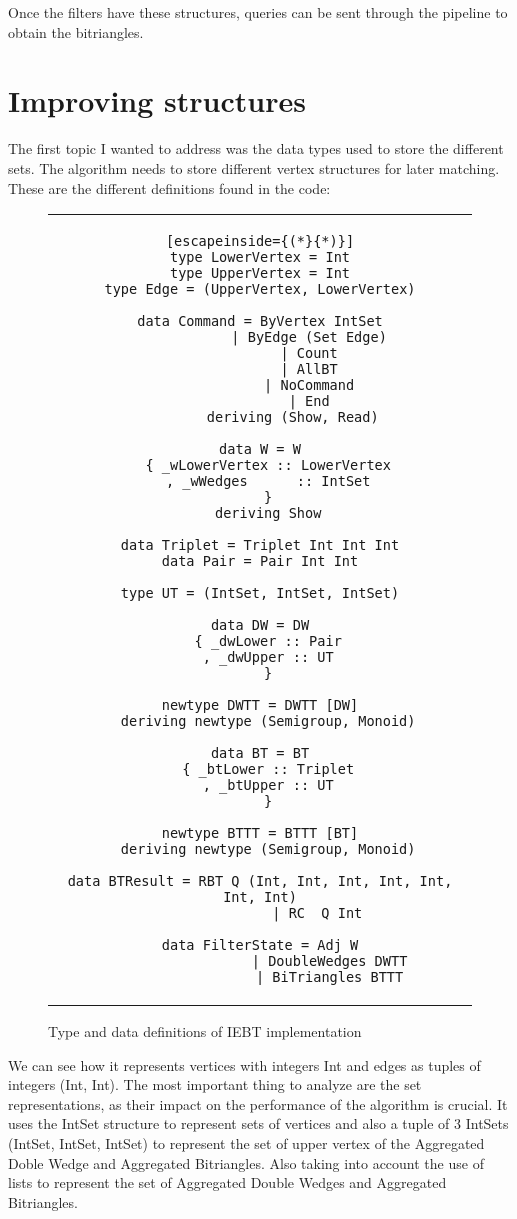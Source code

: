 Once the filters have these structures, queries can be sent through the pipeline to obtain the bitriangles.
\section{Improving structures}
The first topic I wanted to address was the data types used to store the different sets.
The algorithm needs to store different vertex structures for later matching.
These are the different definitions found in the code:

\begin{figure}[H]
    \begin{tabular}{c}
        \begin{lstlisting}[escapeinside={(*}{*)}]
type LowerVertex = Int
type UpperVertex = Int
type Edge = (UpperVertex, LowerVertex)

data Command = ByVertex IntSet
            | ByEdge (Set Edge)
            | Count
            | AllBT
            | NoCommand
            | End
        deriving (Show, Read)

data W = W
  { _wLowerVertex :: LowerVertex
  , _wWedges      :: IntSet
  }
  deriving Show

data Triplet = Triplet Int Int Int
data Pair = Pair Int Int

type UT = (IntSet, IntSet, IntSet)

data DW = DW
  { _dwLower :: Pair
  , _dwUpper :: UT
  }

newtype DWTT = DWTT [DW]
  deriving newtype (Semigroup, Monoid)

data BT = BT
  { _btLower :: Triplet
  , _btUpper :: UT
  }

newtype BTTT = BTTT [BT]
  deriving newtype (Semigroup, Monoid)

data BTResult = RBT Q (Int, Int, Int, Int, Int, Int, Int)
              | RC  Q Int

data FilterState = Adj W
                 | DoubleWedges DWTT
                 | BiTriangles BTTT
        \end{lstlisting}
    \end{tabular}
    \caption[{[IEBT] Type and data definitions}]{Type and data definitions of IEBT implementation}
    \label{fig:HC40}
\end{figure}


We can see how it represents vertices with integers Int and edges as tuples of integers (Int, Int).
The most important thing to analyze are the set representations, as their impact on the performance of the algorithm is crucial.
It uses the IntSet structure to represent sets of vertices and also a tuple of 3 IntSets (IntSet, IntSet, IntSet) to represent the set of upper vertex of the Aggregated Doble Wedge and Aggregated Bitriangles. \cite[][Page52]{royo_sales_algorithm_2021}
Also taking into account the use of lists to represent the set of Aggregated Double Wedges and Aggregated Bitriangles. \\

